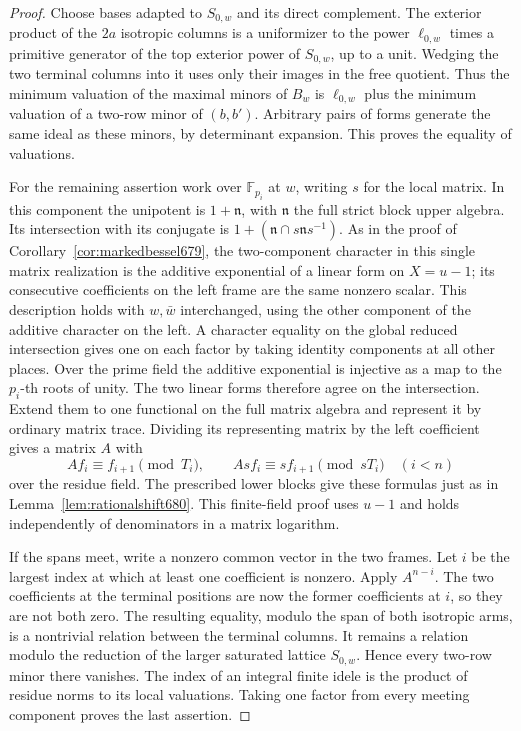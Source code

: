 \documentclass[a4paper,11pt]{article}
\theoremstyle{definition}
\theoremstyle{remark}
\numberwithin{equation}{section}
\begin{document}
\begin{proof}
Choose bases adapted to \(S_{0,w}\) and its direct complement.
The exterior product of the \(2a\) isotropic columns is a
uniformizer to the power \(\ell_{0,w}\) times a primitive generator
of the top exterior power of \(S_{0,w}\), up to a unit. Wedging
the two terminal columns into it uses only their images in the
free quotient. Thus the minimum valuation of the maximal minors
of \(B_w\) is \(\ell_{0,w}\) plus the minimum valuation of a
two-row minor of \((b,b')\). Arbitrary pairs of forms generate
the same ideal as these minors, by determinant expansion. This
proves the equality of valuations.

For the remaining assertion work over \(\mathbb F_{p_i}\) at
\(w\), writing \(s\) for the local matrix. In this component
the unipotent is \(1+\mathfrak n\), with \(\mathfrak n\) the full
strict block upper algebra. Its intersection with its conjugate
is \(1+(\mathfrak n\cap s\mathfrak n s^{-1})\). As in the proof of
Corollary~\ref{cor:markedbessel679}, the two-component character
in this single matrix realization is the additive exponential
of a linear form on \(X=u-1\); its consecutive coefficients
on the left frame are the same nonzero scalar. This description
holds with \(w,\bar w\) interchanged, using the other component
of the additive character on the left. A character equality
on the global reduced intersection gives one on each factor
by taking identity components at all other places.
Over the prime field the additive exponential is injective as
a map to the \(p_i\)-th roots of unity. The two linear forms
therefore agree on the intersection. Extend them to one
functional on the full matrix algebra and represent it by
ordinary matrix trace. Dividing its representing matrix by
the left coefficient gives a matrix \(A\) with
\[
 A f_i\equiv f_{i+1}\pmod {T_i},\qquad
 A s f_i\equiv s f_{i+1}\pmod {s T_i}\quad(i<n)
\]
over the residue field. The prescribed lower blocks give
these formulas just as in Lemma~\ref{lem:rationalshift680}.
This finite-field proof uses \(u-1\) and holds independently
of denominators in a matrix logarithm.

If the spans meet, write a nonzero common vector in the two
frames. Let \(i\) be the largest index at which at least one
coefficient is nonzero. Apply \(A^{n-i}\). The two coefficients
at the terminal positions are now the former coefficients at
\(i\), so they are not both zero. The resulting equality, modulo
the span of both isotropic arms, is a nontrivial relation between
the terminal columns. It remains a relation modulo the reduction
of the larger saturated lattice \(S_{0,w}\). Hence every
two-row minor there vanishes. The index of an integral finite
idele is the product of residue norms to its local valuations.
Taking one factor from every meeting component proves the last
assertion.
\end{proof}
\end{document}
